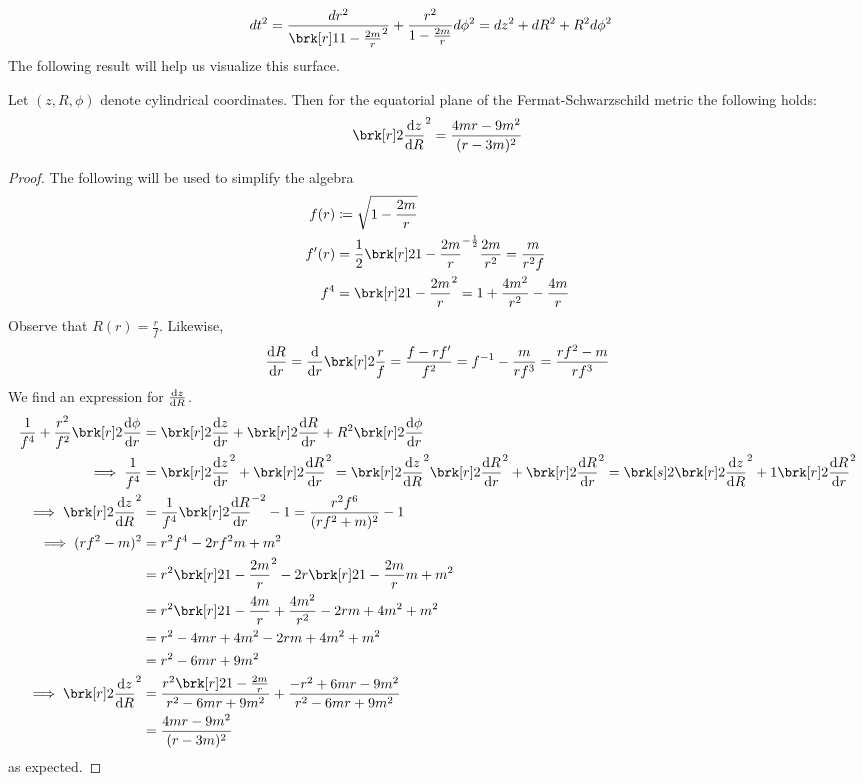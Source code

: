 \begin{align*}
dt^2 &= \frac{dr^2}{\brk[r]1{1 - \frac{2m}{r}}^2} + \frac{r^2}{1 - \frac{2m}{r}} d\phi^2 = dz^2 + dR^2 + R^2 d\phi^2
\end{align*}
The following result will help us visualize this surface.
\begin{proposition}[]\label{}
Let $(z, R, \phi)$ denote cylindrical coordinates. Then for the equatorial plane of the Fermat-Schwarzschild metric the following holds:
\begin{equation}\label{}
\brk[r]2{\diff{z}{R}}^2 = \frac{4mr-9m^2}{(r-3m)^2}
\end{equation}
\end{proposition}
\begin{proof}
The following will be used to simplify the algebra
\begin{align*}
f(r) &\defn \sqrt{1 - \frac{2m}{r}} \\
f'(r) &= \frac{1}{2}\brk[r]2{1-\frac{2m}{r}}^{-\frac{1}{2}}\frac{2m}{r^2} = \frac{m}{r^2f} \\
f^4 &= \brk[r]2{1 - \frac{2m}{r}}^2 = 1 + \frac{4m^2}{r^2} - \frac{4m}{r}
\end{align*}
Observe that $R(r) = \frac{r}{f}$. Likewise,
\begin{equation}\label{}
\diff{R}{r} = \diff{}{r} \brk[r]2{\frac{r}{f}} = \frac{f - rf'}{f^2} = f^{-1} - \frac{m}{rf^3} = \frac{rf^2 - m}{rf^3}
\end{equation}
We find an expression for $\diff{z}{R}$.
\begin{align*}
\frac{1}{f^4} + \frac{r^2}{f^2} \brk[r]2{\diff{\phi}{r}} &= \brk[r]2{\diff{z}{r}} + \brk[r]2{\diff{R}{r}} + R^2 \brk[r]2{\diff{\phi}{r}} \\
\implies \frac{1}{f^4} &= \brk[r]2{\diff{z}{r}}^2 + \brk[r]2{\diff{R}{r}}^2 = \brk[r]2{\diff{z}{R}}^2 \brk[r]2{\diff{R}{r}}^2 + \brk[r]2{\diff{R}{r}}^2 = \brk[s]2{\brk[r]2{\diff{z}{R}}^2 + 1}\brk[r]2{\diff{R}{r}}^2 \\
\implies \brk[r]2{\diff{z}{R}}^2 &= \frac{1}{f^4} \brk[r]2{\diff{R}{r}}^{-2} - 1 = \frac{r^2 f^6}{(rf^2 + m)^2} - 1 \\
\implies (rf^2-m)^2 &= r^2f^4 - 2rf^2m + m^2 \\
&= r^2 \brk[r]2{1 - \frac{2m}{r}^2} - 2r \brk[r]2{1 - \frac{2m}{r}}m + m^2 \\
&= r^2 \brk[r]2{1 - \frac{4m}{r} + \frac{4m^2}{r^2}} - 2rm + 4m^2 + m^2 \\
&= r^2 - 4mr + 4m^2 - 2rm + 4m^2 + m^2 \\
&= r^2 - 6mr + 9m^2 \\
\implies \brk[r]2{\diff{z}{R}}^2 &= \frac{r^2 \brk[r]2{1 - \frac{2m}{r}}}{r^2 - 6mr + 9m^2} + \frac{-r^2 + 6mr - 9m^2}{r^2 - 6mr + 9m^2} \\
&= \frac{4mr - 9m^2}{(r-3m)^2}
\end{align*}
as expected.
\end{proof}
